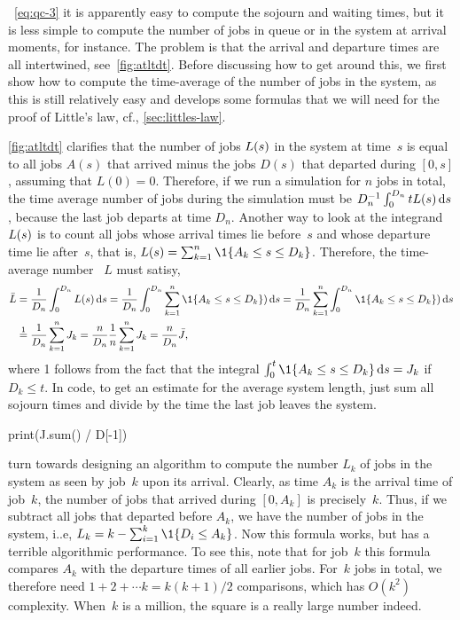 \documentclass[stochastic-or.tex]{subfiles}
\begin{document}
~\cref{eq:qc-3} it is apparently easy to compute the sojourn and waiting times, but it is less simple to compute the number of jobs in queue or in the system at arrival moments, for instance.
The problem is that the arrival and departure times are all intertwined, see~\cref{fig:atltdt}.
Before discussing how to get around this, we first show how to compute the time-average of the number of jobs in the system, as this is still relatively easy and develops some formulas that we will need for the proof of Little's law, cf., \cref{sec:littles-law}.

\cref{fig:atltdt} clarifies that the number of jobs $L(s)$ in the system at time~$s$ is equal to all jobs $A(s)$ that arrived minus the jobs $D(s)$ that departed during $[0,s]$, assuming that $L(0)= 0$.
Therefore, if we run a simulation for $n$ jobs in total, the time average number of jobs during the simulation must be $D_{n}^{-1}\int_0^{D_{n}}t L(s) \,\textrm{d}s$, because the last job departs at time $D_{n}$.
Another way to look at the integrand $L(s)$ is to count all jobs whose arrival times lie before~$s$ and whose departure time lie after~$s$, that is, $\L(s) = \sum_{k=1}^{n} \1{A_k\leq s \leq D_{k}}$.
Therefore, the time-average number ~$L$ must satisy,
\begin{align*}
\bar L&=  \frac{1}{D_{n}}\int_{0}^{D_{n}} L(s) \d s =
  \frac{1}{D_{n}}\int_{0}^{D_{n}} \sum_{k=1}^n \1{A_k\leq s \leq D_{k}}) \d s
=  \frac{1}{D_{n}} \sum_{k=1}^n \int_{0}^{D_{n}}\1{A_k\leq s \leq D_{k}}) \d s \\
  &\stackrel1=  \frac{1}{D_{n}} \sum_{k=1}^n J_{k} =  \frac n{D_{n}} \frac{1}{n} \sum_{k=1}^n J_{k} = \frac n{D_{n}} \bar J,
\end{align*}
where 1 follows from the fact that the integral $\int_{0}^{t} \1{A_k\leq s \leq D_k} \d s = J_{k}$ if $D_k \leq t$.
In code, to get an estimate for the average system length, just sum all sojourn times and divide by the time the last job leaves the system.

\begin{python}
print(J.sum() / D[-1])
\end{python}


 turn towards designing an algorithm to compute the number $L_{k}$ of jobs in the system as seen by job~$k$ upon its arrival.
Clearly, as time $A_{k}$ is the arrival time of job~$k$, the number of jobs that arrived during $[0, A_{k}]$ is precisely~$k$.
Thus, if we subtract all jobs that departed before $A_{k}$, we have the number of jobs in the system, i..e, $L_{k} = k - \sum_{i=1}^{k} \1{D_i \leq A_{k}}$.
Now this formula works, but has a terrible algorithmic performance.
To see this, note that for job~$k$ this formula compares $A_{k}$ with the departure times of all earlier jobs.
For~$k$ jobs in total, we therefore need $1 + 2 + \cdots k = k(k+1)/2$ comparisons, which has $O(k^{2})$ complexity.
When~$k$ is a million, the square is a really large number indeed.
\end{document}

